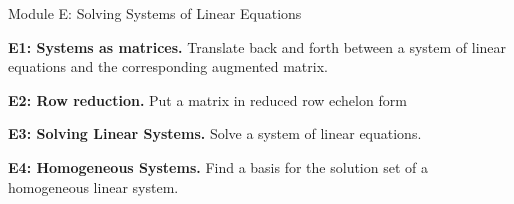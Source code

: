 
\begin{module}{Module E: Solving Systems of Linear Equations}

\begin{moduleStandards}
  \item \textbf{E1: Systems as matrices.}
        Translate back and forth between a system of linear equations and
        the corresponding augmented matrix.
  \item \textbf{E2: Row reduction.}
        Put a matrix in reduced row echelon form
  \item \textbf{E3: Solving Linear Systems.}
        Solve a system of linear equations.
  \item \textbf{E4: Homogeneous Systems.}
        Find a basis for the solution set of a homogeneous linear system.
\end{moduleStandards}






\end{module}
